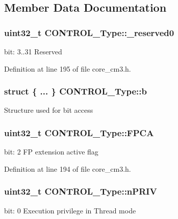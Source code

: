 \subsection{\-Member \-Data \-Documentation}
\hypertarget{union_c_o_n_t_r_o_l___type_af8c314273a1e4970a5671bd7f8184f50}{
\subsubsection[{\-\_\-reserved0}]{\setlength{\rightskip}{0pt plus 5cm}uint32\-\_\-t {\bf \-C\-O\-N\-T\-R\-O\-L\-\_\-\-Type\-::\-\_\-reserved0}}}\label{union_c_o_n_t_r_o_l___type_af8c314273a1e4970a5671bd7f8184f50}
bit\-: 3..31 \-Reserved 

\-Definition at line 195 of file core\-\_\-cm3.\-h.

\hypertarget{union_c_o_n_t_r_o_l___type_adc6a38ab2980d0e9577b5a871da14eb9}{
\subsubsection[{b}]{\setlength{\rightskip}{0pt plus 5cm}struct \{ ... \}   {\bf \-C\-O\-N\-T\-R\-O\-L\-\_\-\-Type\-::b}}}\label{union_c_o_n_t_r_o_l___type_adc6a38ab2980d0e9577b5a871da14eb9}
\-Structure used for bit access \hypertarget{union_c_o_n_t_r_o_l___type_ac62cfff08e6f055e0101785bad7094cd}{
\subsubsection[{\-F\-P\-C\-A}]{\setlength{\rightskip}{0pt plus 5cm}uint32\-\_\-t {\bf \-C\-O\-N\-T\-R\-O\-L\-\_\-\-Type\-::\-F\-P\-C\-A}}}\label{union_c_o_n_t_r_o_l___type_ac62cfff08e6f055e0101785bad7094cd}
bit\-: 2 \-F\-P extension active flag 

\-Definition at line 194 of file core\-\_\-cm3.\-h.

\hypertarget{union_c_o_n_t_r_o_l___type_a35c1732cf153b7b5c4bd321cf1de9605}{
\subsubsection[{n\-P\-R\-I\-V}]{\setlength{\rightskip}{0pt plus 5cm}uint32\-\_\-t {\bf \-C\-O\-N\-T\-R\-O\-L\-\_\-\-Type\-::n\-P\-R\-I\-V}}}\label{union_c_o_n_t_r_o_l___type_a35c1732cf153b7b5c4bd321cf1de9605}
bit\-: 0 \-Execution privilege in \-Thread mode 

